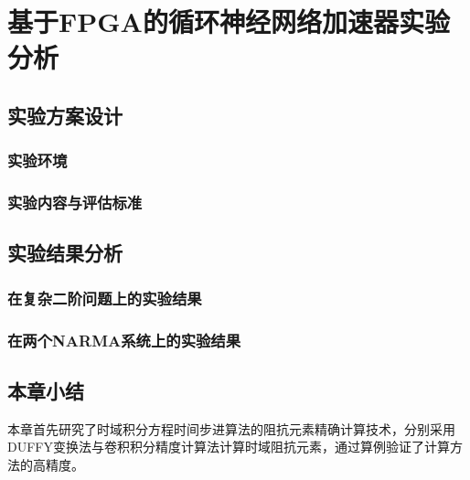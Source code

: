 \chapter{基于FPGA的循环神经网络加速器实验分析}
\section{实验方案设计}

\subsection{实验环境}
\subsection{实验内容与评估标准}

\section{实验结果分析}

\subsection{在复杂二阶问题上的实验结果}

\subsection{在两个NARMA系统上的实验结果}

\section{本章小结}
本章首先研究了时域积分方程时间步进算法的阻抗元素精确计算技术，分别采用DUFFY变换法与卷积积分精度计算法计算时域阻抗元素，通过算例验证了计算方法的高精度。
